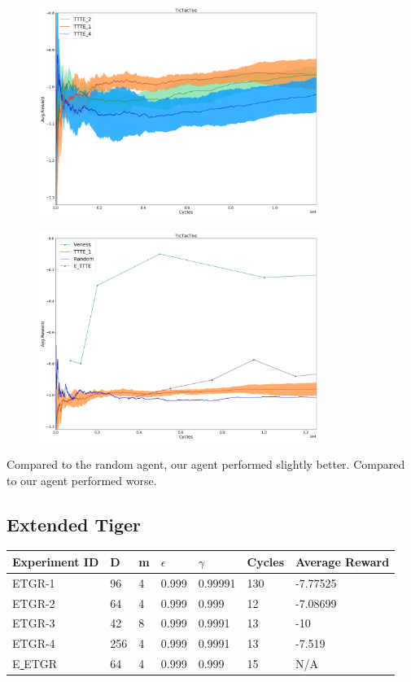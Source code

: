 \documentclass{article}
\theoremstyle{definition}
\newtheorem{primary statistics}[definition]{Primary Statistics}
\newtheorem{auxiliary statistics}[definition]{Auxiliary Statistics}
\begin{document}
 \begin{figure}[h]
 \centering
    \includegraphics[width=9.1cm]{4_TicTacToe}
\end{figure}

 \begin{figure}[h]
 \centering
    \includegraphics[width=9.1cm]{TicTacToe}
\end{figure}

Compared to the random agent, our agent performed slightly better. Compared to \citep{veness2011monte} our agent performed worse.

\newpage

\subsection{Extended Tiger}
 \begin{tabular}{|l|l|l|l|l|l|l|}
 \hline \centering
 Experiment ID& D & m & $\epsilon$ & $\gamma$ & Cycles & Average Reward \\ \hline
ETGR-1 & 96        & 4           & 0.999       & 0.99991           & 130    & -7.77525        \\ \hline
ETGR-2 & 64        & 4           & 0.999       & 0.999             & 12     & -7.08699       \\ \hline
ETGR-3 & 42        & 8           & 0.999       & 0.9991            & 13     & -10             \\ \hline
ETGR-4 & 256       & 4           & 0.999       & 0.9991            & 13     & -7.519  \\ \hline 
E\underline{ }ETGR & 64       & 4           & 0.999       & 0.999            & 15     & N/A  \\ \hline    
\end{tabular} 
\end{document}
